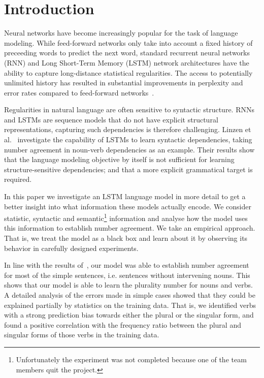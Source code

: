 \section{Introduction}

Neural networks have become increasingly popular
for the task of language modeling.
While feed-forward networks only take into account
a fixed history of preceeding words to predict the next word,
standard recurrent neural networks (RNN) and 
Long Short-Term Memory (LSTM) network architectures
have the ability to capture long-distance statistical regularities.
The access to potentially unlimited history 
has resulted in substantial improvements 
in perplexity and error rates
compared to feed-forward networks~\citep{Mikolov2010,Sundermeyer2013}. 

Regularities in natural language are often sensitive to syntactic structure.
RNNs and LSTMs are sequence models that do not have explicit
structural representations,
capturing such dependencies is therefore challenging.
Linzen et al.~\cite{Linzen2016} investigate the capability
of LSTMs to learn syntactic dependencies, taking
number agreement in noun-verb dependencies as an example.
Their results show that the language modeling objective by itself
is not sufficient for learning structure-sensitive dependencies;
and that a more explicit grammatical target is required.

In this paper we investigate an LSTM language model
in more detail to get a better insight into what 
information these models actually encode.
We consider statistic, syntactic and 
semantic\footnote{
Unfortunately the experiment was not completed
because one of the team members quit the project.
} information and analyse how the model uses this information
to establish number agreement. 
We take an empirical approach.
That is, we treat the model as a black box
and learn about it by observing its behavior
in carefully designed experiments.

In line with the results of~\citep{Linzen2016},
our model was able to establish number agreement 
for most of the simple sentences,
i.e. sentences without intervening nouns.
This shows that our model is able to learn the 
plurality number for nouns and verbs.
A detailed analysis of the errors made in simple cases
showed that they could be explained partially by 
statistics on the training data.
That is, we identified verbs with a strong 
prediction bias towards
either the plural or the singular form,
and found a positive correlation with the
frequency ratio between the plural and singular forms
of those verbs in the training data.
%

